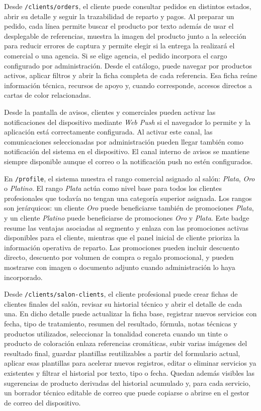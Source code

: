 Desde \texttt{/clients/orders}, el cliente puede consultar pedidos en distintos estados, abrir su detalle y seguir la trazabilidad de reparto y pagos. Al preparar un pedido, cada línea permite buscar el producto por texto además de usar el desplegable de referencias, muestra la imagen del producto junto a la selección para reducir errores de captura y permite elegir si la entrega la realizará el comercial o una agencia. Si se elige agencia, el pedido incorpora el cargo configurado por administración. Desde el catálogo, puede navegar por productos activos, aplicar filtros y abrir la ficha completa de cada referencia. Esa ficha reúne información técnica, recursos de apoyo y, cuando corresponde, accesos directos a cartas de color relacionadas.

Desde la pantalla de avisos, clientes y comerciales pueden activar las notificaciones del dispositivo mediante \textit{Web Push} si el navegador lo permite y la aplicación está correctamente configurada. Al activar este canal, las comunicaciones seleccionadas por administración pueden llegar también como notificación del sistema en el dispositivo. El canal interno de avisos se mantiene siempre disponible aunque el correo o la notificación push no estén configurados.

En \texttt{/profile}, el sistema muestra el rango comercial asignado al salón: \textit{Plata}, \textit{Oro} o \textit{Platino}. El rango \textit{Plata} actúa como nivel base para todos los clientes profesionales que todavía no tengan una categoría superior asignada. Los rangos son jerárquicos: un cliente \textit{Oro} puede beneficiarse también de promociones \textit{Plata}, y un cliente \textit{Platino} puede beneficiarse de promociones \textit{Oro} y \textit{Plata}. Este badge resume las ventajas asociadas al segmento y enlaza con las promociones activas disponibles para el cliente, mientras que el panel inicial de cliente prioriza la información operativa de reparto. Las promociones pueden incluir descuento directo, descuento por volumen de compra o regalo promocional, y pueden mostrarse con imagen o documento adjunto cuando administración lo haya incorporado.

Desde \texttt{/clients/salon-clients}, el cliente profesional puede crear fichas de clientes finales del salón, revisar su historial técnico y abrir el detalle de cada una. En dicho detalle puede actualizar la ficha base, registrar nuevos servicios con fecha, tipo de tratamiento, resumen del resultado, fórmula, notas técnicas y productos utilizados, seleccionar la tonalidad concreta cuando un tinte o producto de coloración enlaza referencias cromáticas, subir varias imágenes del resultado final, guardar plantillas reutilizables a partir del formulario actual, aplicar esas plantillas para acelerar nuevos registros, editar o eliminar servicios ya existentes y filtrar el historial por texto, tipo o fecha. Quedan además visibles las sugerencias de producto derivadas del historial acumulado y, para cada servicio, un borrador técnico editable de correo que puede copiarse o abrirse en el gestor de correo del dispositivo.

